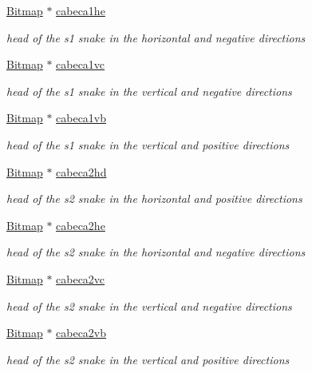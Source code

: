 \begin{DoxyCompactItemize}
\hyperlink{structBitmap}{Bitmap} $\ast$ \hyperlink{group__graphics_ga5989c4f83267088c9fdb6d1251d2e092}{cabeca1he}
\begin{DoxyCompactList}\small\item\em head of the s1 snake in the horizontal and negative directions \end{DoxyCompactList}\item 
\hyperlink{structBitmap}{Bitmap} $\ast$ \hyperlink{group__graphics_ga257cc4fca4ad7cceb125e4e43f62a17b}{cabeca1vc}
\begin{DoxyCompactList}\small\item\em head of the s1 snake in the vertical and negative directions \end{DoxyCompactList}\item 
\hyperlink{structBitmap}{Bitmap} $\ast$ \hyperlink{group__graphics_ga5737d3b582663eb60cd3fd47421707b3}{cabeca1vb}
\begin{DoxyCompactList}\small\item\em head of the s1 snake in the vertical and positive directions \end{DoxyCompactList}\item 
\hyperlink{structBitmap}{Bitmap} $\ast$ \hyperlink{group__graphics_ga74f59c6b2020b67b1e4c40b4d07b7dcb}{cabeca2hd}
\begin{DoxyCompactList}\small\item\em head of the s2 snake in the horizontal and positive directions \end{DoxyCompactList}\item 
\hyperlink{structBitmap}{Bitmap} $\ast$ \hyperlink{group__graphics_gad921a321d31f1c5f8430770b09949bd8}{cabeca2he}
\begin{DoxyCompactList}\small\item\em head of the s2 snake in the horizontal and negative directions \end{DoxyCompactList}\item 
\hyperlink{structBitmap}{Bitmap} $\ast$ \hyperlink{group__graphics_gabcbbaac60aafd8e9549fcef5fa6acb83}{cabeca2vc}
\begin{DoxyCompactList}\small\item\em head of the s2 snake in the vertical and negative directions \end{DoxyCompactList}\item 
\hyperlink{structBitmap}{Bitmap} $\ast$ \hyperlink{group__graphics_ga50f31017797fe46247d3ef644f6670c9}{cabeca2vb}
\begin{DoxyCompactList}\small\item\em head of the s2 snake in the vertical and positive directions \end{DoxyCompactList}\item 

\end{DoxyCompactItemize}
